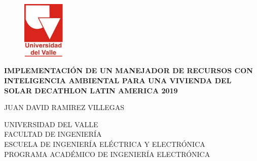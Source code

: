 \pagestyle{empty}
\begin{center}

\begin{figure}[htbp]
	\centering
		\includegraphics[width=2cm]{figuras/Logo_UV.pdf}
	\label{Logo_UV}
\end{figure}

\vspace{2cm}

\textbf{\large{IMPLEMENTACI\'ON DE UN MANEJADOR DE RECURSOS CON INTELIGENCIA AMBIENTAL PARA UNA VIVIENDA DEL SOLAR DECATHLON LATIN AMERICA 2019}}

\vspace{4cm}

\large{
JUAN DAVID RAMIREZ VILLEGAS
}

\vspace{4cm}

\large{UNIVERSIDAD DEL VALLE}\\
\large{FACULTAD DE INGENIERÍA}\\
\large{ESCUELA DE INGENIERÍA ELÉCTRICA Y ELECTRÓNICA}\\
\large{PROGRAMA ACADÉMICO DE INGENIERÍA ELECTRÓNICA}\\
\large{\Today}


\vspace{4cm}

\end{center}
\newpage